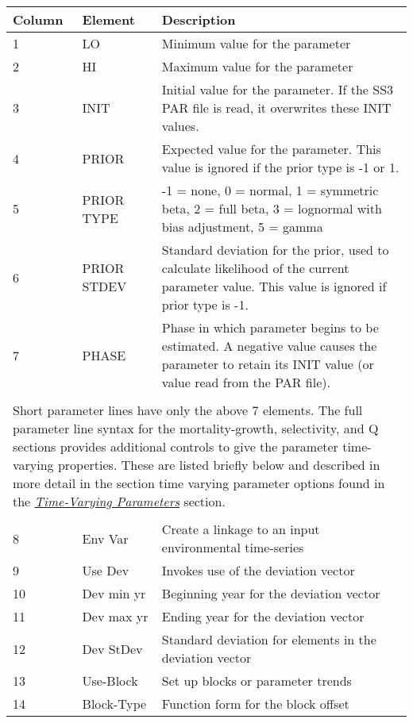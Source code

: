 \begin{center}
	\begin{tabular}{p{2cm} p{3cm} p{10cm}}
		Column & Element & Description\\
		\hline
		1 & LO & Minimum value for the parameter\\
		2 & HI & Maximum value for the parameter\\
		3 & INIT & Initial value for the parameter.  If the SS3 PAR file is read, it overwrites these INIT values.\\
		4 & PRIOR & Expected value for the parameter.  This value is ignored if the prior type is -1 or 1.\\
		5 & PRIOR TYPE  & -1 = none, 0 = normal, 1 = symmetric beta, 2 = full beta, 3 = lognormal with bias adjustment, 5 = gamma\\
		6 & PRIOR STDEV & Standard deviation for the prior, used to calculate likelihood of the current parameter value. This value is ignored if prior type is -1. \\
		7 & PHASE & Phase in which parameter begins to be estimated.  A negative value causes the parameter to retain its INIT value (or value read from the PAR file).\\
		 & & \\
		\multicolumn{3}{l}{\parbox{16cm}{Short parameter lines have only the above 7 elements.  The full parameter line syntax for the mortality-growth, selectivity, and Q sections provides additional controls to give the parameter time-varying properties.  These are listed briefly below and described in more detail in the section time varying parameter options found in the \hyperlink{TVpara}{\textit{Time-Varying Parameters}} section.}}\\
		 & & \\
		8 & Env Var & Create a linkage to an input environmental time-series\\
		9 & Use Dev & Invokes use of the deviation vector \\
		10 & Dev min yr & Beginning year for the deviation vector \\
		11 & Dev max yr & Ending year for the deviation vector\\
		12 & Dev StDev & Standard deviation for elements in the deviation vector \\
		13 & Use-Block & Set up blocks or parameter trends\\
		14 & Block-Type & Function form for the block offset\\
		\hline
	\end{tabular}
\end{center}

